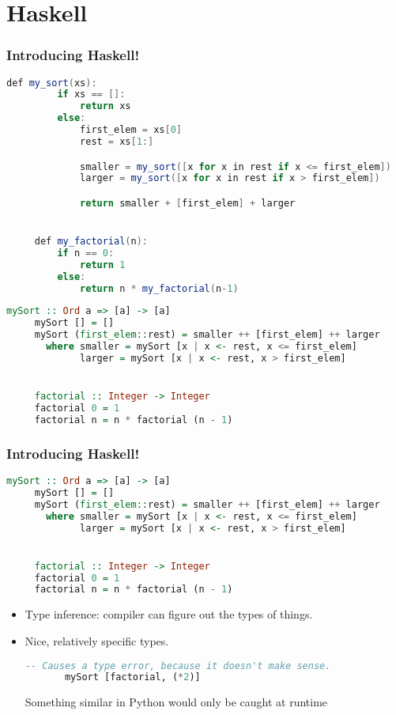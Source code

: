 \documentclass{beamer}
\begin{document}
\section{Haskell}

\begin{frame}[fragile]
  \frametitle{Introducing Haskell!}
  \begin{lstlisting}[frame=single, language=Java, breaklines=true, basicstyle=\ttfamily\tiny]
     def my_sort(xs):
         if xs == []:
             return xs
         else:
             first_elem = xs[0]
             rest = xs[1:]

             smaller = my_sort([x for x in rest if x <= first_elem])
             larger = my_sort([x for x in rest if x > first_elem])

             return smaller + [first_elem] + larger


     def my_factorial(n):
         if n == 0:
             return 1
         else:
             return n * my_factorial(n-1)
  \end{lstlisting}

  \pause

  \begin{lstlisting}[frame=single, language=Haskell, breaklines=true, basicstyle=\ttfamily\tiny]
     mySort :: Ord a => [a] -> [a]
     mySort [] = []
     mySort (first_elem::rest) = smaller ++ [first_elem] ++ larger
       where smaller = mySort [x | x <- rest, x <= first_elem]
             larger = mySort [x | x <- rest, x > first_elem]


     factorial :: Integer -> Integer
     factorial 0 = 1
     factorial n = n * factorial (n - 1)
  \end{lstlisting}
\end{frame}

\begin{frame}[fragile]
    \frametitle{Introducing Haskell!}
    \begin{lstlisting}[frame=single, language=Haskell, breaklines=true, basicstyle=\ttfamily\tiny]
     mySort :: Ord a => [a] -> [a]
     mySort [] = []
     mySort (first_elem::rest) = smaller ++ [first_elem] ++ larger
       where smaller = mySort [x | x <- rest, x <= first_elem]
             larger = mySort [x | x <- rest, x > first_elem]


     factorial :: Integer -> Integer
     factorial 0 = 1
     factorial n = n * factorial (n - 1)
   \end{lstlisting}

   \begin{itemize}
   \item Type inference: compiler can figure out the types of things.
   \item Nice, relatively specific types.
     \begin{lstlisting}[frame=single, language=Haskell, breaklines=true, basicstyle=\ttfamily\tiny]
       -- Causes a type error, because it doesn't make sense.
       mySort [factorial, (*2)]
     \end{lstlisting}

     Something similar in Python would only be caught at runtime
   \end{itemize}
\end{frame}
\end{document}
